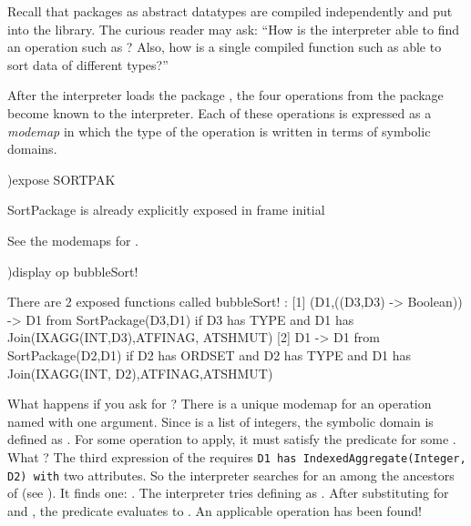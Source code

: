 %
Recall that packages as abstract datatypes are compiled independently
and put into the library.
The curious reader may ask: ``How is the interpreter able to find an
operation such as ?
Also, how is a single compiled function such as  able
to sort data of different types?''

After the interpreter loads the package , the four
operations from the package become known to the interpreter.
Each of these operations is expressed as a {\it modemap} in which the type
of the operation is written in terms of symbolic domains.
\begin{noOutputXtc}
\begin{xtccomment}
\end{xtccomment}
\begin{spadsrc}
)expose SORTPAK
\end{spadsrc}
\begin{SysCmdOutput}
   SortPackage is already explicitly exposed in frame initial 
\end{SysCmdOutput}
\end{noOutputXtc}

\begin{xtc}
\begin{xtccomment}
See the modemaps for .
\end{xtccomment}
\begin{spadsrc}
)display op bubbleSort!
\end{spadsrc}
\begin{SysCmdOutput}

There are 2 exposed functions called bubbleSort! :
   [1] (D1,((D3,D3) -> Boolean)) -> D1 from SortPackage(D3,D1)
            if D3 has TYPE and D1 has Join(IXAGG(INT,D3),ATFINAG,
            ATSHMUT)
   [2] D1 -> D1 from SortPackage(D2,D1)
            if D2 has ORDSET and D2 has TYPE and D1 has Join(IXAGG(INT,
            D2),ATFINAG,ATSHMUT)
\end{SysCmdOutput}
\end{xtc}

What happens if you ask for ?
There is a unique modemap for an operation named
 with one argument.
Since \spad{[1,-5,3]} is a list of integers, the symbolic domain
 is defined as .
For some operation to apply, it must satisfy the predicate for
some .
What ?
The third expression of the  requires {\tt D1 has
IndexedAggregate(Integer, D2) with} two attributes.
So the interpreter searches for an 
among the ancestors of  (see
).
It finds one: .
The interpreter tries defining  as .
After substituting for  and , the predicate
evaluates to .
An applicable operation has been found!

